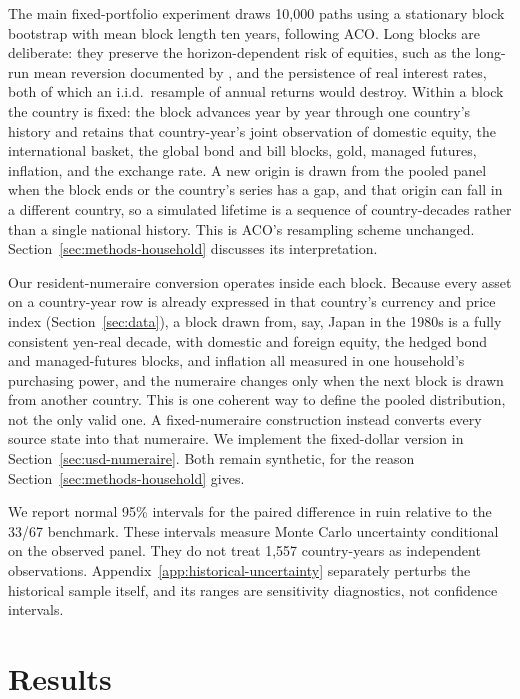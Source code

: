 \documentclass[11pt]{article}
\begin{document}
The main fixed-portfolio experiment draws 10,000 paths using a stationary block
bootstrap with mean block length ten years, following ACO. Long blocks are
deliberate: they preserve the horizon-dependent risk of equities, such as the
long-run mean reversion documented by \citet{PoterbaSummers1988}, and the
persistence of real interest rates, both of which an i.i.d.\ resample of annual
returns would destroy. Within a block the country is fixed: the block advances
year by year through one country's history and retains that country-year's
joint observation of domestic equity, the international basket, the global bond
and bill blocks, gold, managed futures, inflation, and the exchange rate. A new origin is drawn from the pooled panel
when the block ends or the country's series has a gap, and that origin can fall
in a different country, so a simulated lifetime is a sequence of country-decades
rather than a single national history. This is ACO's resampling scheme
unchanged. Section~\ref{sec:methods-household} discusses its interpretation.

Our resident-numeraire conversion operates inside each block. Because every
asset on a country-year row is already expressed in that country's currency and
price index (Section~\ref{sec:data}), a block drawn from, say, Japan in the
1980s is a fully consistent yen-real decade, with domestic and foreign equity,
the hedged bond and managed-futures blocks, and inflation all measured in one
household's purchasing power, and the numeraire changes only when the next
block is drawn from another country. This is one coherent way to define the
pooled distribution, not the only valid one. A fixed-numeraire construction
instead converts every source state into that numeraire. We implement the
fixed-dollar version in Section~\ref{sec:usd-numeraire}. Both remain
synthetic, for the reason Section~\ref{sec:methods-household} gives.

We report normal 95\% intervals for the paired difference in ruin relative to
the 33/67 benchmark. These intervals measure Monte Carlo uncertainty
conditional on the observed panel. They do not treat 1,557 country-years as
independent observations. Appendix~\ref{app:historical-uncertainty} separately
perturbs the historical sample itself, and its ranges are sensitivity
diagnostics, not confidence intervals.


\section{Results}
\end{document}
